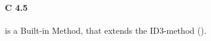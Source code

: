\paragraph{C 4.5}
\label{par:methods.flat.embedded.c4_5}

  
is a Built-in Method, that extends the ID3-method (\cite{Salzberg:94}).